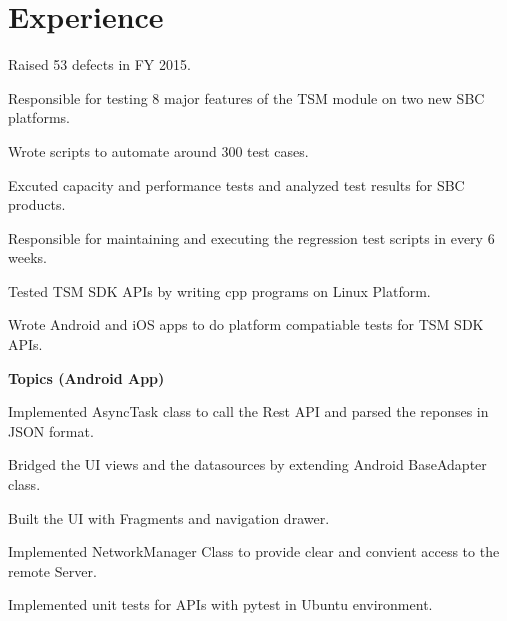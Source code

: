 \documentclass[letterpaper]{lyu-resume} %
\begin{document}
\hfill
%
%
\begin{minipage}[t]{0.66\textwidth} %


\section{Experience}


\vspace{\topsep} %
\begin{tightitemize}
\item Raised 53 defects in FY 2015.
\item Responsible for testing 8 major features of the TSM module on two new SBC platforms. 
\item Wrote scripts to automate around 300 test cases.
\item Excuted capacity and performance tests and analyzed test results for SBC products.
\item Responsible for maintaining and executing the regression test scripts in every 6 weeks.
\item Tested TSM SDK APIs by writing cpp programs on Linux Platform.
\item Wrote Android and iOS apps to do platform compatiable tests for TSM SDK APIs.
\end{tightitemize}

\sectionspace %



\textbf{Topics (Android App)}
\begin{tightitemize}
\item Implemented AsyncTask class to call the Rest API and parsed the reponses in JSON format.
\item Bridged the UI views and the datasources by extending Android BaseAdapter class.
\item Built the UI with Fragments and navigation drawer.
\item Implemented NetworkManager Class to provide clear and convient access to the remote Server.
\item Implemented unit tests for APIs with pytest in Ubuntu environment. 
\end{tightitemize}


\end{minipage}
\end{document}

